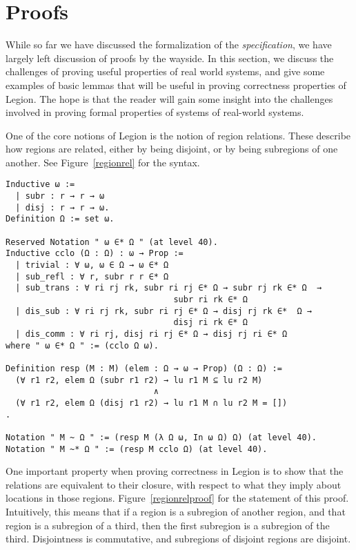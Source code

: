 \documentclass[sigconf]{acmart}
\begin{document}
\section{Proofs}

While so far we have discussed the formalization of the \emph{specification},
we have largely left discussion of proofs by the wayside. In this section, we
discuss the challenges of proving useful properties of real world systems, and
give some examples of basic lemmas that will be useful in proving correctness
properties of Legion. The hope is that the reader will gain some insight into
the challenges involved in proving formal properties of systems of real-world
systems.

One of the core notions of Legion is the notion of region relations. These
describe how regions are related, either by being disjoint, or by being
subregions of one another. See Figure~\ref{regionrel} for the syntax. 

\begin{figure*}
\centering
\begin{BVerbatim}
Inductive ω := 
  | subr : r → r → ω 
  | disj : r → r → ω.
Definition Ω := set ω.

Reserved Notation " ω ∈* Ω " (at level 40).
Inductive cclo (Ω : Ω) : ω → Prop := 
  | trivial : ∀ ω, ω ∈ Ω → ω ∈* Ω
  | sub_refl : ∀ r, subr r r ∈* Ω
  | sub_trans : ∀ ri rj rk, subr ri rj ∈* Ω → subr rj rk ∈* Ω  → 
                                  subr ri rk ∈* Ω 
  | dis_sub : ∀ ri rj rk, subr ri rj ∈* Ω → disj rj rk ∈*  Ω → 
                                  disj ri rk ∈* Ω
  | dis_comm : ∀ ri rj, disj ri rj ∈* Ω → disj rj ri ∈* Ω 
where " ω ∈* Ω " := (cclo Ω ω).

Definition resp (M : M) (elem : Ω → ω → Prop) (Ω : Ω) :=
  (∀ r1 r2, elem Ω (subr r1 r2) → lu r1 M ⊆ lu r2 M)
                              ∧ 
  (∀ r1 r2, elem Ω (disj r1 r2) → lu r1 M ∩ lu r2 M = [])
.

Notation " M ~ Ω " := (resp M (λ Ω ω, In ω Ω) Ω) (at level 40).
Notation " M ~* Ω " := (resp M cclo Ω) (at level 40).
\end{BVerbatim}
\caption{Syntax for region relations}
\label{regionrel}
\end{figure*}

One important property when proving correctness in Legion is to show that the
relations are equivalent to their closure, with respect to what they imply
about locations in those regions.  Figure~\ref{regionrelproof} for the
statement of this proof. Intuitively, this means that if a region is a
subregion of another region, and that region is a subregion of a third, then
the first subregion is a subregion of the third. Disjointness is commutative, 
and subregions of disjoint regions are disjoint.
\end{document}
